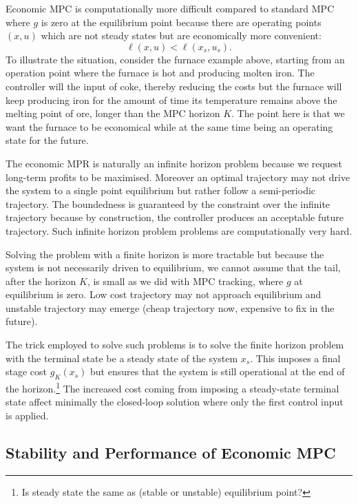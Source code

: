 \documentclass[11pt]{report}
\begin{document}
Economic MPC is computationally more difficult compared to standard MPC where $g$ is zero at the equilibrium point because there are operating points $(x,u)$ which are not steady states but are economically more convenient:
\begin{equation*}
  \ell(x,u) < \ell(x_s,u_s).
\end{equation*}
To illustrate the situation, consider the furnace example above, starting from an operation point where the furnace is hot and producing molten iron. The controller will the input of coke, thereby reducing the costs but the furnace will keep producing iron for the amount of time its temperature remains above the melting point of ore, longer than the MPC horizon $K$. The point here is that we want the furnace to be economical while at the same time being an operating state for the future.

The economic MPR is naturally an infinite horizon problem because we request long-term profits to be maximised. Moreover an optimal trajectory may not drive the system to a single point equilibrium but rather follow a semi-periodic trajectory. The boundedness is guaranteed by the constraint over the infinite trajectory because by construction, the controller produces an acceptable future trajectory. Such infinite horizon problem problems are computationally very hard.

Solving the problem with a finite horizon is more tractable but because the system is not necessarily driven to equilibrium, we cannot assume that the tail, after the horizon $K$, is small as we did with MPC tracking, where $g$ at equilibrium is zero. Low cost trajectory may not approach equilibrium and unstable trajectory may emerge (cheap trajectory now, expensive to fix in the future).

The trick employed to solve such problems is to solve the finite horizon problem with the terminal state be a steady state of the system $x_s$. This imposes a final stage cost $g_K(x_s)$ but ensures that the system is still operational at the end of the horizon.\footnote{Is steady state the same as (stable or unstable) equilibrium point?} The increased cost coming from imposing a steady-state terminal state affect minimally the closed-loop solution where only the first control input is applied.

\subsection{Stability and Performance of Economic MPC}
\label{sec:stability-performance-economic-MPC}
\end{document}
